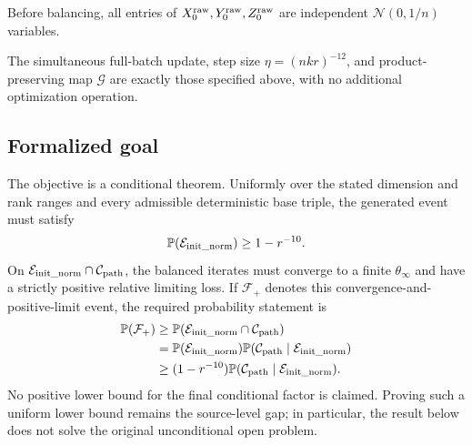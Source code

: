 \begin{assumption}
\label{assump:independent_initialization}
Before balancing, all entries of
$X_0^{\rm raw},Y_0^{\rm raw},Z_0^{\rm raw}$ are independent
$\mathcal N(0,1/n)$ variables.
\end{assumption}

\begin{assumption}
\label{assump:gd_step}
The simultaneous full-batch update, step size $\eta=(nkr)^{-12}$, and
product-preserving map $\mathcal G$ are exactly those specified above, with no
additional optimization operation.
\end{assumption}

\subsection{Formalized goal}

The objective is a conditional theorem.  Uniformly over the stated dimension
and rank ranges and every admissible deterministic base triple, the generated
event must satisfy
\[
  \mathbb P(\mathcal E_{\rm init\_norm})\ge1-r^{-10}.
\]
On $\mathcal E_{\rm init\_norm}\cap\mathcal C_{\rm path}$, the balanced
iterates must converge to a finite $\theta_\infty$ and have a strictly positive
relative limiting loss.  If $\mathcal F_+$ denotes this
convergence-and-positive-limit event, the required probability statement is
\[
\begin{aligned}
 \mathbb P(\mathcal F_+)
 &\ge \mathbb P(\mathcal E_{\rm init\_norm}\cap\mathcal C_{\rm path})\\
 &=\mathbb P(\mathcal E_{\rm init\_norm})
   \mathbb P(\mathcal C_{\rm path}\mid\mathcal E_{\rm init\_norm})\\
 &\ge(1-r^{-10})
   \mathbb P(\mathcal C_{\rm path}\mid\mathcal E_{\rm init\_norm}).
\end{aligned}
\]
No positive lower bound for the final conditional factor is claimed.  Proving
such a uniform lower bound remains the source-level gap; in particular, the
result below does not solve the original unconditional open problem.
